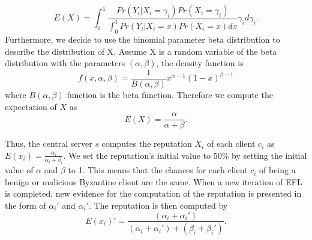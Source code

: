 \documentclass[journal]{IEEEtran}
\begin{document}
\begin{equation}
  E(X)=\int_{0}^{1}\frac{Pr\left ( Y_{i}|X_{i}=\gamma_{i} \right )Pr(X_{i}=\gamma_{i})}{\int_{0}^{1}Pr\left ( Y_{i}|X_{i}=x \right )Pr(X_{i}=x)dx}\gamma_{i}d\gamma_{i}\label{equation_3}.
\end{equation}
Furthermore, we decide to use the binomial parameter beta distribution to describe the distribution of X. Assume X is a random variable of the beta distribution with the parameters $(\alpha, \beta)$, the density function is
\begin{equation}
  f(x,\alpha,\beta)=\frac{1}{B(\alpha,\beta)}x^{\alpha-1}(1-x)^{\beta-1}\label{equation-4}
\end{equation}
where $B(\alpha, \beta)$ function is the beta function. Therefore we compute the expectation of $X$ as
\begin{equation}
  E(X)=\frac{\alpha}{\alpha+\beta}.
\end{equation}

Thus, the central server ${s}$ computes the reputation $X_i$ of each client ${c_{i}}$ as ${E(x_{i})=\frac{\alpha_{i}}{\alpha_{i}+\beta_{i}}}$. We set the reputation's initial value to 50\% by setting the initial value of $\alpha$ and $\beta$ to 1. This means that the chances for each client $c_ i$ of being a benign or malicious Byzantine client are the same. When a new iteration of EFL is completed, new evidence for the computation of the reputation is presented in the form of ${\alpha_{i}}'$ and ${\alpha_{i}}'$. The reputation is then computed by
\begin{equation}
  {E(x_{i})}'=\frac{(\alpha_{i}+{\alpha_{i}}')}{(\alpha_{i}+{\alpha_{i}}')+(\beta_{i}+{\beta_{i}}')}.
\end{equation}
\end{document}
